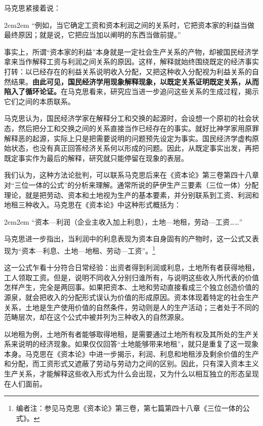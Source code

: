 \documentclass[a4paper,twoside,12pt,AutoFakeBold]{ctexart}
\begin{document}
马克思紧接着说：

\begin{adjustwidth}{2em}{2em}
\qquad\fangsong
“例如，当它确定工资和资本利润之间的关系时，它把资本家的利益当做最终原因；就是说，它把应当加以阐明的东西当做前提。”
\end{adjustwidth}

事实上，所谓“资本家的利益”本身就是一定社会生产关系的产物，却被国民经济学拿来当作解释工资与利润之间关系的原因。这样，解释就始终围绕既定的经济事实打转：以已经存在的利益关系说明收入分配，又把这种收入分配视为利益关系的自然结果。\textbf{由此可见，国民经济学用现象解释现象，以既定关系证明既定关系，从而陷入了循环论证。}在马克思看来，研究应当进一步追问这些关系的生成过程，揭示它们之间的本质联系。

马克思认为，国民经济学家在解释分工和交换的起源时，会设想一个原初的社会状态，然后把分工和交换之间的关系直接当作已经存在的事实。就好比神学家用原罪解释恶的起源，实际上只是把需要说明的问题预先设定为事实。国民经济学虚构原始状态，也没有真正回答经济关系何以形成的问题。因此，从既定事实出发，再把既定事实作为最后的解释，研究就只能停留在现象的表层。

我们认为，这种方法论批判，可以联系马克思后来在《资本论》第三卷第四十八章对“三位一体的公式”的分析来理解。通常所说的萨伊生产三要素（三位一体）分配理论，就是把劳动、资本和土地视为生产的基本要素，并分别联系到工资、利润和地租三种收入。马克思在《资本论》中这种形式概括为：

\begin{adjustwidth}{2em}{2em}
\qquad\fangsong
“资本—利润（企业主收入加上利息），土地—地租，劳动—工资……”
\end{adjustwidth}

马克思进一步指出，当利润中的利息表现为资本自身固有的产物时，这一公式又表现为“资本—利息、土地—地租、劳动—工资”。\footnote{编者注：参见马克思《资本论》第三卷，第七篇第四十八章《三位一体的公式》。}

这一公式乍看十分符合日常经验：出资者得到利润或利息，土地所有者获得地租，工人领取工资。但是，说明不同收入分别归谁所有，与说明这些收入所代表的价值怎样产生，完全是两回事。如果把资本、土地和劳动直接看成三个独立创造价值的源泉，就会把收入的分配形式误认为价值的形成原因。资本体现着特定的社会生产关系，土地是生产使用价值的自然条件，劳动则是人的生产活动；三者处于不同的范畴层次，却在这个公式中被并列为三种收入的自然源泉。

以地租为例，土地所有者能够取得地租，是需要通过土地所有权及其所处的生产关系来说明的经济现象。如果仅仅回答“土地能够带来地租”，就只是重复了这一现象本身。马克思在《资本论》中进一步揭示，利润、利息和地租涉及剩余价值的生产和分配，而工资形式又遮蔽了劳动与劳动力之间的区别。因此，只有深入资本主义生产关系，才能解释这些收入形式为什么会出现，又为什么以相互独立的形态呈现在人们面前。
\end{document}
